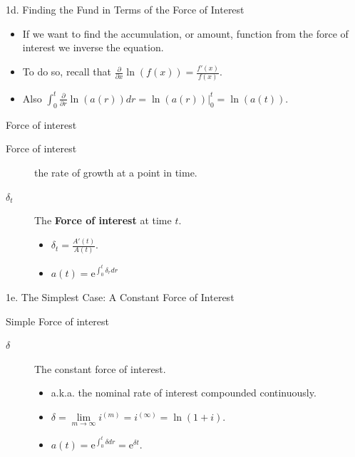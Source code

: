 \begin{CHPT_SUMM_AUTO}[label = {L.-1d}]{1d. Finding the Fund in Terms of the Force of Interest}
	\begin{itemize}[leftmargin = *]
		\item	If we want to find the accumulation, or amount, function from the force of interest we inverse the equation.
		\item	To do so, recall that $\frac{\partial}{\partial x}\ln(f(x)) = \frac{f'(x)}{f(x)}$.
		\item	Also $\int_{0}^{t} \frac{\partial}{\partial r} \ln(a(r)) dr = 	\ln(a(r))\big|_{0}^{t} =	\ln(a(t))$.
	\end{itemize}
	
\begin{FORMULA_SUMM}{Force of interest}
\begin{description}
	\item[Force of interest]	the rate of growth at a point in time.
	\item[$\delta_{t}$]	The \textbf{Force of interest} at time $t$.
		\begin{itemize}[leftmargin = *]
		\item	$\delta_{t} = \frac{A'(t)}{A(t)}$.
		\item	$a(t)	=	\textrm{e}^{\int_{0}^{t}\delta_{r}dr}$
		\end{itemize}
\end{description}
\end{FORMULA_SUMM}
\end{CHPT_SUMM_AUTO}

\begin{CHPT_SUMM_AUTO}[label = {L.-1e}]{1e. The Simplest Case: A Constant Force of Interest}

\begin{FORMULA_SUMM}{Simple Force of interest}
\begin{description}
	\item[$\delta$]	The constant force of interest.
		\begin{itemize}[leftmargin = *]
		\item	a.k.a. the nominal rate of interest compounded continuously.
		\item	$\delta = \underset{m \rightarrow \infty}{\lim} i^{(m)} = i^{(\infty)} = \ln(1 + i)$.
		\item	$a(t)	=	\textrm{e}^{\int_{0}^{t}\delta dr}	=	\textrm{e}^{\delta t}$.
		\end{itemize}
\end{description}
\end{FORMULA_SUMM}
\end{CHPT_SUMM_AUTO}

